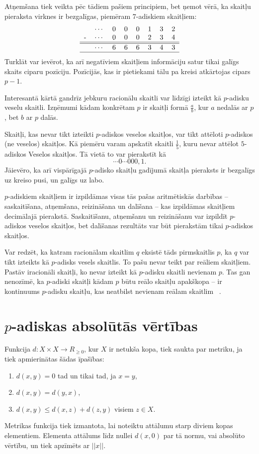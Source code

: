 \documentclass{ludis}
\begin{document}
Atņemšana tiek veikta pēc tādiem pašiem principiem, bet ņemot vērā, ka skaitļu pieraksta virknes ir bezgalīgas, piemēram $7$-adiskiem skaitļiem:
\[
\begin{tabular}{rrrrrrrrr|}
&$\cdots$ &0 &0 &0 &1 &3 &2\\
-&$\cdots$ &0 &0 &0 &2 &3 &4\\
\hline
\hline
&$\cdots$ &6 &6 &6 &3 &4 &3\\
\hline
\end{tabular}
\]
Turklāt var ievērot, ka arī negatīviem skaitļiem informāciju satur tikai galīgs skaits ciparu pozīciju. Pozīcijās, kas ir pietiekami tālu pa kreisi atkārtojas cipars $p-1$.

Interesantā kārtā gandrīz jebkuru racionālu skaitli var līdzīgi izteikt kā $p$-adisku veselu skaitli.
Izņēmumi kādam konkrētam $p$ ir skaitļi formā $\frac{a}{b}$, kur $a$ nedalās ar $p$, bet $b$ ar $p$ dalās.

Skaitļi, kas nevar tikt izteikti $p$-adiskos veselos skaitļos, var tikt attēloti $p$-adiskos (ne veselos) skaitļos. Kā piemēru varam apskatīt skaitli $\frac{1}{5}$, kuru nevar attēlot $5$-adiskos Veselos skaitļos. Tā vietā to var pierakstīt kā
\[
\cdots 0 \cdots 000,1.
\]
Jāievēro, ka arī vispārīgajā $p$-adisko skaitļu gadījumā skaitļa pieraksts ir bezgalīgs uz kreiso pusi, un galīgs uz labo.

$p$-adiskiem skaitļiem ir izpildāmas visas tās pašas aritmētiskās darbības -- saskaitīšana, atņemšana, reizināšana un dalīšana -- kas izpildāmas skaitļiem decimālajā pierakstā. Saskaitīšanu, atņemšanu un reizināšanu var izpildīt $p$-adiskos veselos skaitļos, bet dalīšanas rezultāts var būt pierakstām tikai $p$-adiskos skaitļos.

Var redzēt, ka katram racionālam skaitlim $q$ eksistē tāds pirmskaitlis $p$, ka $q$ var tikt izteikts kā $p$-adisks vesels skaitlis. To pašu nevar teikt par reāliem skaitļiem. Pastāv iracionāli skaitļi, ko nevar izteikt kā $p$-adisku skaitli nevienam $p$. Tas gan nenozīmē, ka $p$-adiski skaitļi kādam $p$ būtu reālo skaitļu apakškopa -- ir kontinuums $p$-adisku skaitļu, kas neatbilst nevienam reālam skaitlim ~\citep{Freivalds2012}.

\section{$p$-adiskas absolūtās vērtības}
Funkcija $d: X \times X \rightarrow R_{\geq 0}$, kur $X$ ir netukša kopa, tiek saukta par metriku, ja tiek apmierinātas šādas īpašības:
\begin{enumerate}
\item $d(x,y) = 0$ tad un tikai tad, ja $x = y$,
\item $d(x,y) = d(y,x)$,
\item $d(x,y) \leq d(x,z) + d(z,y)$ visiem $z \in X$.
\end{enumerate}
Metrikas funkcija tiek izmantota, lai noteiktu attālumu starp diviem kopas elementiem. Elementa attālums līdz nullei $d(x,0)$ par tā normu, vai absolūto vērtību, un tiek apzīmēts ar $||x||$.
\end{document}
